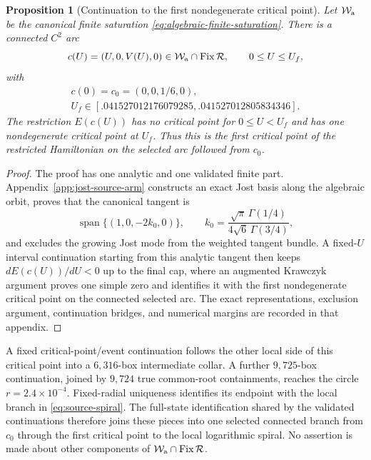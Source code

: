 \documentclass[11pt]{amsart}
\numberwithin{equation}{section}
\newtheorem{proposition}[theorem]{Proposition}
\theoremstyle{definition}
\theoremstyle{remark}
\newcommand{\cR}{\mathcal R}
\newcommand{\Fix}{\operatorname {Fix}}
\begin{document}
\begin{proposition}[Continuation to the first nondegenerate critical point]
\label{prop:exact-source-outer-fold}
Let $\mathcal W_{\rm a}$ be the canonical finite saturation
\eqref{eq:algebraic-finite-saturation}.  There is a connected
$C^2$ arc
\begin{equation}\label{eq:exact-source-arc}
 c(U)=(U,0,V(U),0)\in\mathcal W_{\rm a}\cap\Fix\cR,
 \qquad 0\le U\le U_f,
\end{equation}
with
\begin{equation}\label{eq:c0}
 \begin{gathered}
 c(0)=c_0=(0,0,1/6,0),\\
 U_f\in[.041527012176079285,.041527012805834346].
 \end{gathered}
\end{equation}
The restriction $E(c(U))$ has no critical point for $0\le U<U_f$ and has
one nondegenerate critical point at $U_f$.  Thus this is the first critical
point of the restricted Hamiltonian on the selected arc followed from
$c_0$.
\end{proposition}

\begin{proof}
The proof has one analytic and one validated finite part.  Appendix~\ref{app:jost-source-arm} constructs an exact Jost basis along the algebraic orbit, proves that the canonical tangent is
\[
 \operatorname{span}\{(1,0,-2k_0,0)\},
 \qquad
 k_0=\frac{\sqrt\pi\,\Gamma(1/4)}
 {4\sqrt6\,\Gamma(3/4)},
\]
and excludes the growing Jost mode from the weighted tangent bundle.  A
fixed-$U$ interval continuation starting from this analytic tangent then
keeps $dE(c(U))/dU<0$ up to the final cap, where an augmented Krawczyk
argument proves one simple zero and identifies it with the first
nondegenerate critical point on the connected selected arc.  The exact
representations, exclusion
argument, continuation bridges, and numerical margins are recorded in
that appendix.
\end{proof}

A fixed critical-point/event continuation follows the other local side of
this critical point into
a $6{,}316$-box intermediate collar.  A further $9{,}725$-box continuation,
joined by $9{,}724$ true common-root containments, reaches the circle
$r=2.4\times10^{-4}$.  Fixed-radial uniqueness identifies its endpoint with
the local branch in \eqref{eq:source-spiral}.  The full-state identification
shared by the validated continuations therefore joins these pieces into one
selected connected branch from $c_0$ through the first critical point to the local
logarithmic spiral.  No assertion is made about other components of
$\mathcal W_{\rm a}\cap\Fix\cR$.
\end{document}
